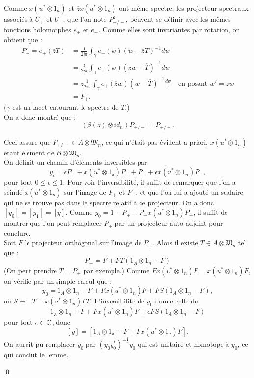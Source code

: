 \begin{dem}
Comme $x(u^*\otimes 1_n)$ et  $\overline z x(u^*\otimes 1_n)$ ont même spectre, les projecteur spectraux associés à $U_+$ et $U_-$, que l'on note $P_{+/-}^z$, peuvent se définir avec les mêmes fonctions holomorphes $e_+$ et $e_-$. Comme elles sont invariantes par rotation,  on obtient que :
\begin{align*}
P_+^z=e_+(\overline z T ) & =\frac{1}{2i\pi} \int_\gamma e_+(w)(w-\overline z T)^{-1} dw\\
				&=\frac{z}{2i\pi} \int_\gamma e_+(w)(zw-\overline T)^{-1} dw \\
				&=z\frac{1}{2i\pi} \int_\gamma e_+(\overline z w)(w-\overline T)^{-1} \frac{dw}{z}\quad \text{en posant } w'=zw\\
				&= P_+.
\end{align*}
($\gamma$ est un lacet entourant le spectre de $T$.)\\
On a donc montré que :
\[(\beta(z)\otimes id_n)P_{+/-}=P_{+/-}.\] 

Ceci assure que $P_{+/-}\in A\otimes \mathfrak M_n$, ce qui n'était pas évident a priori, $x(u^*\otimes 1_n)$ étant élément de $B\otimes\mathfrak M_n$.\\

On définit un chemin d'éléments inversibles par  
\[y_\epsilon = \epsilon P_+ + x(u^*\otimes 1_n) P_+ + P_- + \epsilon x(u^*\otimes 1_n) P_-,\]
pour tout $ 0\leq \epsilon \leq 1$. Pour voir l'inversibilité, il suffit de remarquer que l'on a scindé $x(u^*\otimes 1_n)$ sur l'image de $P_+$ et $P_-$, et que l'on lui a ajouté un scalaire qui ne se trouve pas dans le spectre relatif à ce projecteur.
On a donc $[y_0]=[y_1]=[y]$. Comme $y_0= 1-P_+ + P_+ x(u^*\otimes 1_n)P_+$, il suffit de montrer que l'on peut remplacer $P_+$ par un projecteur auto-adjoint pour conclure.\\

Soit $F$ le projecteur orthogonal sur l'image de $P_+$. Alors il existe $T\in A\otimes \mathfrak M_n$ tel que :
\[P_+=F + FT(1_A\otimes 1_n-F)\] %
(On peut prendre $T=P_+$ par exemple.) Comme $Fx(u^*\otimes 1_n)F=x(u^*\otimes 1_n)F$, on vérifie par un simple calcul que :
\[y_0=1_A\otimes 1_n -F+Fx(u^*\otimes 1_n)F+FS(1_A\otimes 1_n-F),\]
où $S=-T-x(u^*\otimes 1_n)FT$. L'inversibilité de $y_0$ donne celle de 
\[1_A\otimes 1_n -F + F x(u^*\otimes 1_n) F +\epsilon FS (1_A\otimes 1_n-F)\]
pour tout $\epsilon \in \mathbb C$, donc 
\[[y]=[1_A\otimes 1_n -F+ F x(u^*\otimes 1_n)F].\]
On aurait pu remplacer $y_0$ par $(y_0 y_0 ^*)^{-\frac{1}{2}} y_0$ qui est unitaire et homotope à $y_0$, ce qui conclut le lemme.

\qed
\end{dem}

